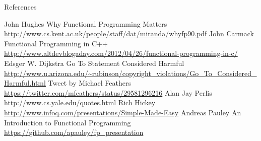 \documentclass[mathserif]{beamer}
\begin{document}
\begin{frame}[allowframebreaks]{References}
  \begin{thebibliography}{10}
      John Hughes
      \newblock Why Functional Programming Matters
      \newblock \url{http://www.cs.kent.ac.uk/people/staff/dat/miranda/whyfp90.pdf}
      John Carmack
      \newblock Functional Programming in C++
      \newblock \url{http://www.altdevblogaday.com/2012/04/26/functional-programming-in-c/}
      Edsger W. Dijkstra
      \newblock Go To Statement Considered Harmful
      \newblock \url{http://www.u.arizona.edu/~rubinson/copyright_violations/Go_To_Considered_Harmful.html}
      Tweet by Michael Feathers
      \newblock \url{https://twitter.com/mfeathers/status/29581296216}
      Alan Jay Perlis
      \newblock \url{http://www.cs.yale.edu/quotes.html}
      Rich Hickey
      \newblock \url{http://www.infoq.com/presentations/Simple-Made-Easy}
      Andreas Pauley
      \newblock An Introduction to Functional Programming
      \newblock \url{https://github.com/apauley/fp_presentation}
  \end{thebibliography}
\end{frame}
\end{document}
